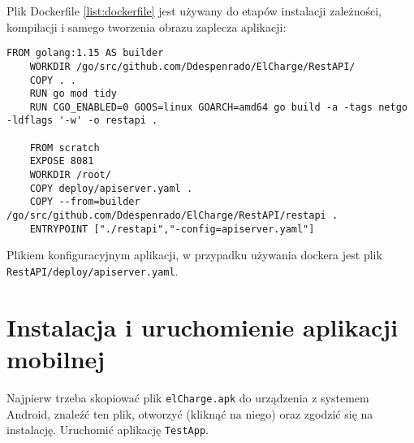 Plik Dockerfile \ref{list:dockerfile} jest używany do etapów instalacji zależności, kompilacji i samego tworzenia obrazu zaplecza aplikacji:
\begin{lstlisting}[label=list:dockerfile,caption=Dockerfile,basicstyle=\tiny\ttfamily]
    FROM golang:1.15 AS builder
    WORKDIR /go/src/github.com/Ddespenrado/ElCharge/RestAPI/
    COPY . .
    RUN go mod tidy
    RUN CGO_ENABLED=0 GOOS=linux GOARCH=amd64 go build -a -tags netgo -ldflags '-w' -o restapi .
    
    FROM scratch
    EXPOSE 8081
    WORKDIR /root/
    COPY deploy/apiserver.yaml .
    COPY --from=builder /go/src/github.com/Ddespenrado/ElCharge/RestAPI/restapi .
    ENTRYPOINT ["./restapi","-config=apiserver.yaml"]
\end{lstlisting}

Plikiem konfiguracyjnym aplikacji, w przypadku używania dockera jest plik \texttt{RestAPI/deploy/apiserver.yaml}.


\section{Instalacja i uruchomienie aplikacji mobilnej}
Najpierw trzeba skopiować plik \texttt{elCharge.apk} do urządzenia z systemem Android, znaleźć ten plik, otworzyć (kliknąć na niego) oraz zgodzić się na instalację.
Uruchomić aplikację \texttt{TestApp}.